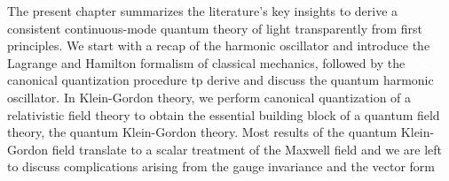 The present chapter summarizes the literature's key insights to derive a consistent continuous-mode quantum theory of light transparently from first principles.
We start with a recap of the harmonic oscillator and introduce the Lagrange and Hamilton formalism of classical mechanics, followed by the canonical quantization procedure tp derive and discuss the quantum harmonic oscillator.
In Klein-Gordon theory, we perform canonical quantization of a relativistic field theory to obtain the essential building block of a quantum field theory, the quantum Klein-Gordon theory.
Most results of the quantum Klein-Gordon field translate to a scalar treatment of the Maxwell field and we are left to discuss complications arising from the gauge invariance and the vector form